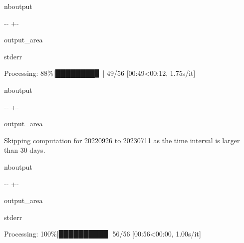 \documentclass[letterpaper,10pt,english]{sphinxmanual}
\begin{document}
\begin{sphinxuseclass}{nboutput}
{

\kern-\sphinxverbatimsmallskipamount\kern-\baselineskip
\kern+\FrameHeightAdjust\kern-\fboxrule
\vspace{\nbsphinxcodecellspacing}

\begin{sphinxuseclass}{output_area}
\begin{sphinxuseclass}{stderr}


\begin{sphinxVerbatim}[commandchars=\\\{\}]
Processing:  88\%|████████▊ | 49/56 [00:49<00:12,  1.75s/it]
\end{sphinxVerbatim}



\end{sphinxuseclass}
\end{sphinxuseclass}
}

\end{sphinxuseclass}
\begin{sphinxuseclass}{nboutput}
{

\kern-\sphinxverbatimsmallskipamount\kern-\baselineskip
\kern+\FrameHeightAdjust\kern-\fboxrule
\vspace{\nbsphinxcodecellspacing}

\begin{sphinxuseclass}{output_area}
\begin{sphinxuseclass}{}


\begin{sphinxVerbatim}[commandchars=\\\{\}]
Skipping computation for 20220926 to 20230711 as the time interval is larger than 30 days.
\end{sphinxVerbatim}



\end{sphinxuseclass}
\end{sphinxuseclass}
}

\end{sphinxuseclass}
\begin{sphinxuseclass}{nboutput}
{

\kern-\sphinxverbatimsmallskipamount\kern-\baselineskip
\kern+\FrameHeightAdjust\kern-\fboxrule
\vspace{\nbsphinxcodecellspacing}

\begin{sphinxuseclass}{output_area}
\begin{sphinxuseclass}{stderr}


\begin{sphinxVerbatim}[commandchars=\\\{\}]
Processing: 100\%|██████████| 56/56 [00:56<00:00,  1.00s/it]
\end{sphinxVerbatim}



\end{sphinxuseclass}
\end{sphinxuseclass}
}

\end{sphinxuseclass}
\end{document}
